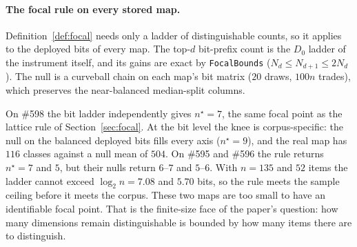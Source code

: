\documentclass[11pt,a4paper]{article}
\theoremstyle{plain}
\theoremstyle{remark}
\begin{document}
\paragraph{The focal rule on every stored map.} Definition~\ref{def:focal} needs only a ladder of distinguishable counts, so it applies to the deployed bits of every map. The top-$d$ bit-prefix count is the $D_0$ ladder of the instrument itself, and its gains are exact by \texttt{FocalBounds} ($N_d\le N_{d+1}\le2N_d$). The null is a curveball chain on each map's bit matrix ($20$ draws, $100n$ trades), which preserves the near-balanced median-split columns.

\begin{table}[h]\centering\small
{}
\caption{The focal rule ($\tau=\tfrac12$ bit) on the deployed bit ladder of each stored map. Ladders: \#598 2, 4, 8, 16, 30, 49, 79, 95, 116; \#595 2, 4, 8, 16, 31, 52, 78, 93, 108; \#596 2, 4, 8, 14, 23, 29, 36, 40, 45. Class counts at $d=9$ against the null: \#598 $z=-160.5$, \#595 $z=-4.8$, \#596 $z=-4.4$.}
\label{tab:focalmaps}
\end{table}

On \#598 the bit ladder independently gives $n^\star=7$, the same focal point as the lattice rule of Section~\ref{sec:focal}. At the bit level the knee is corpus-specific: the null on the balanced deployed bits fills every axis ($n^\star=9$), and the real map has $116$ classes against a null mean of $504$. On \#595 and \#596 the rule returns $n^\star=7$ and $5$, but their nulls return $6$--$7$ and $5$--$6$. With $n=135$ and $52$ items the ladder cannot exceed $\log_2 n=7.08$ and $5.70$ bits, so the rule meets the sample ceiling before it meets the corpus. These two maps are too small to have an identifiable focal point. That is the finite-size face of the paper's question: how many dimensions remain distinguishable is bounded by how many items there are to distinguish.
\end{document}
